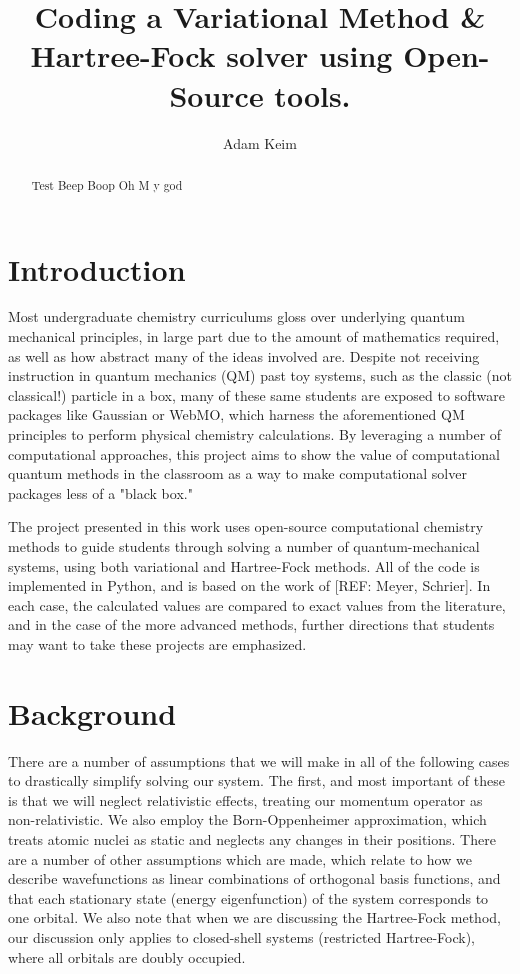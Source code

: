 \documentclass{achemso}
\title{Coding a Variational Method \& Hartree-Fock solver using Open-Source tools.}
\author{Adam Keim}
\begin{document}
\begin{abstract}
Test Beep Boop Oh M y god 
\end{abstract}
\section{Introduction}
Most undergraduate chemistry curriculums gloss over underlying quantum mechanical principles, in large part due to the amount of mathematics required, as well as how abstract many of the ideas involved are. Despite not receiving instruction in quantum mechanics (QM) past toy systems, such as the classic (not classical!) particle in a box, many of these same students are exposed to software packages like Gaussian or WebMO, which harness the aforementioned QM principles to perform physical chemistry calculations.  By leveraging a number of computational approaches, this project aims to show the value of computational quantum methods in the classroom as a way to make computational solver packages less of a "black box."

The project presented in this work uses open-source computational chemistry methods to guide students through solving a number of quantum-mechanical systems, using both variational and Hartree-Fock methods.  All of the code is implemented in Python, and is based on the work of [REF: Meyer, Schrier].  In each case, the calculated values are compared to exact values from the literature, and in the case of the more advanced methods, further directions that students may want to take these projects are emphasized.


\section{Background}
There are a number of assumptions that we will make in all of the following cases to drastically simplify solving our system.  The first, and most important of these is that we will neglect relativistic effects, treating our momentum operator as non-relativistic.  We also employ the Born-Oppenheimer approximation, which treats atomic nuclei as static and neglects any changes in their positions.  There are a number of other assumptions which are made, which relate to how we describe wavefunctions as linear combinations of orthogonal basis functions, and that each stationary state (energy eigenfunction) of the system corresponds to one orbital.  We also note that when we are discussing the Hartree-Fock method, our discussion only applies to closed-shell systems (restricted Hartree-Fock), where all orbitals are doubly occupied. 
\end{document}
